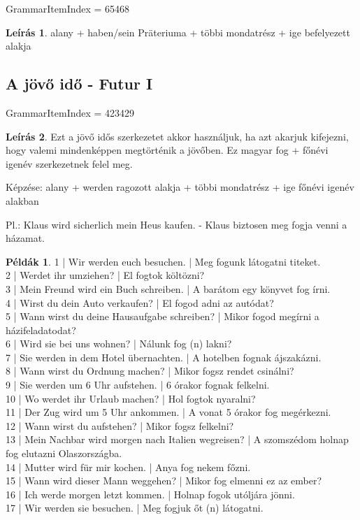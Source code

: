 \documentclass{article}
\theoremstyle{definition}
\newtheorem*{exmp}{Példák}
\newtheorem*{desc}{Leírás}
\begin{document}
GrammarItemIndex = 65468

\begin{desc}
alany + haben/sein Präteriuma + többi mondatrész + ige befelyezett alakja
\end{desc}


\subsection{A jövő idő - Futur I}

GrammarItemIndex = 423429

\begin{desc}
Ezt a jövő idős szerkezetet akkor használjuk, ha azt akarjuk kifejezni, hogy valemi mindenképpen megtörténik a jövőben. Ez magyar fog + főnévi igenév szerkezetnek felel meg.

Képzése: alany + werden ragozott alakja + többi mondatrész + ige főnévi igenév alakban

Pl.: Klaus wird sicherlich mein Heus kaufen. - Klaus biztosen meg fogja venni a házamat.
\end{desc}

\begin{exmp}
1 | Wir werden euch besuchen. | Meg fogunk látogatni titeket.\\
2 | Werdet ihr umziehen? | El fogtok költözni?\\
3 | Mein Freund wird ein Buch schreiben. | A barátom egy könyvet fog írni.\\
4 | Wirst du dein Auto verkaufen? | El fogod adni az autódat?\\
5 | Wann wirst du deine Hausaufgabe schreiben? | Mikor fogod megírni a házifeladatodat?\\
6 | Wird sie bei uns wohnen? | Nálunk fog (n) lakni?\\
7 | Sie werden in dem Hotel übernachten. | A hotelben fognak ájszakázni.\\
8 | Wann wirst du Ordnung machen? | Mikor fogsz rendet csinálni?\\
9 | Sie werden um 6 Uhr aufstehen. | 6 órakor fognak felkelni.\\
10 | Wo werdet ihr Urlaub machen? | Hol fogtok nyaralni?\\
11 | Der Zug wird um 5 Uhr ankommen. | A vonat 5 órakor fog megérkezni.\\
12 | Wann wirst du aufstehen? | Mikor fogsz felkelni?\\
13 | Mein Nachbar wird morgen nach Italien wegreisen? | A szomszédom holnap fog elutazni Olaszországba.\\
14 | Mutter wird für mir kochen. | Anya fog nekem főzni.\\
15 | Wann wird dieser Mann weggehen? | Mikor fog elmenni ez az ember?\\
16 | Ich werde morgen letzt kommen. | Holnap fogok utóljára jönni.\\
17 | Wir werden sie besuchen. | Meg fogjuk őt (n) látogatni.\\
\end{exmp}
\end{document}
